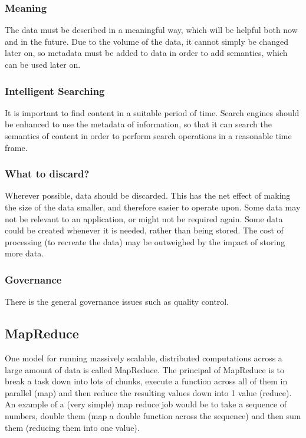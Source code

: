 \documentclass{article}
\begin{document}
{\begin{itemize}
\subsubsection{Meaning}
The data must be described in a meaningful way, which will be helpful both now and in the future. Due to the volume of the data, it cannot simply be changed later on, so metadata must be added to data in order to add semantics, which can be used later on.

\subsubsection{Intelligent Searching}
It is important to find content in a suitable period of time. Search engines should be enhanced to use the metadata of information, so that it can search the semantics of content in order to perform search operations in a reasonable time frame.

\subsubsection{What to discard?}
Wherever possible, data should be discarded. This has the net effect of making the size of the data smaller, and therefore easier to operate upon. Some data may not be relevant to an application, or might not be required again. Some data could be created whenever it is needed, rather than being stored. The cost of processing (to recreate the data) may be outweighed by the impact of storing more data.

\subsubsection{Governance}
There is the general governance issues such as quality control. 

\subsection{MapReduce}
One model for running massively scalable, distributed computations across a large amount of data is called MapReduce. The principal of MapReduce is to break a task down into lots of chunks, execute a function across all of them in parallel (map) and then reduce the resulting values down into 1 value (reduce). An example of a (very simple) map reduce job would be to take a sequence of numbers, double them (map a double function across the sequence) and then sum them (reducing them into one value).


\end{itemize}}
\end{document}
